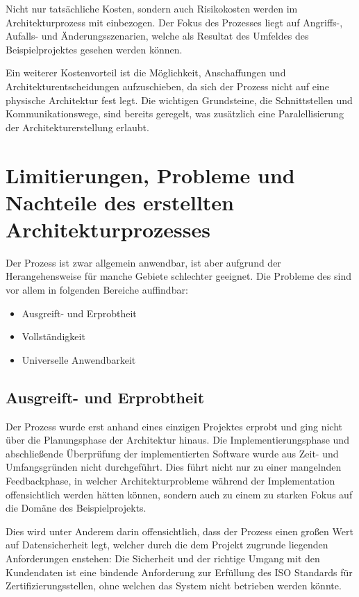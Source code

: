 Nicht nur tatsächliche Kosten, sondern auch Risikokosten werden im Architekturprozess mit einbezogen. Der Fokus des Prozesses liegt auf Angriffs-, Aufalls- und Änderungsszenarien, welche als Resultat des Umfeldes des Beispielprojektes gesehen werden können.

Ein weiterer Kostenvorteil ist die Möglichkeit, Anschaffungen und Architekturentscheidungen aufzuschieben, da sich der Prozess nicht auf eine physische Architektur fest legt. Die wichtigen Grundsteine, die Schnittstellen und Kommunikationswege, sind bereits geregelt, was zusätzlich eine Paralellisierung der Architekturerstellung erlaubt.


\section{Limitierungen, Probleme und Nachteile des erstellten Architekturprozesses}
Der Prozess ist zwar allgemein anwendbar, ist aber aufgrund der Herangehensweise für manche Gebiete schlechter geeignet. Die Probleme des sind vor allem in folgenden Bereiche auffindbar:

\begin{itemize}
  \item Ausgreift- und Erprobtheit
  \item Vollständigkeit
  \item Universelle Anwendbarkeit
\end{itemize}

\subsection{Ausgreift- und Erprobtheit}
Der Prozess wurde erst anhand eines einzigen Projektes erprobt und ging nicht über die Planungsphase der Architektur hinaus. Die Implementierungsphase und abschließende Überprüfung der implementierten Software wurde aus Zeit- und Umfangsgründen nicht durchgeführt. Dies führt nicht nur zu einer mangelnden Feedbackphase, in welcher Architekturprobleme während der Implementation offensichtlich werden hätten können, sondern auch zu einem zu starken Fokus auf die Domäne des Beispielprojekts.

Dies wird unter Anderem darin offensichtlich, dass der Prozess einen großen Wert auf Datensicherheit legt, welcher durch die dem Projekt zugrunde liegenden Anforderungen enstehen: Die Sicherheit und der richtige Umgang mit den Kundendaten ist eine bindende Anforderung zur Erfüllung des ISO Standards für Zertifizierungsstellen, ohne welchen das System nicht betrieben werden könnte. \cite{ISO_CERT}

